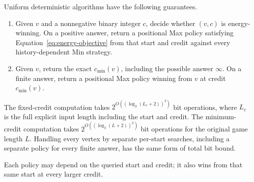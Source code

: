 \begin{corollary}
\label{cor:energy-credits}
Uniform deterministic algorithms have the following guarantees.
\begin{enumerate}
\item Given $v$ and a nonnegative binary integer $c$, decide whether
$(v,c)$ is energy-winning. On a positive answer, return a positional
Max policy satisfying Equation~\eqref{eq:energy-objective} from that
start and credit against every history-dependent Min strategy.
\item Given $v$, return the exact $c_{\min}(v)$, including the possible
answer $\infty$. On a finite answer, return a positional Max policy
winning from $v$ at credit $c_{\min}(v)$.
\end{enumerate}
The fixed-credit computation takes
$2^{O((\log_2(L_c+2))^2)}$ bit operations, where $L_c$ is the full
explicit input length including the start and credit. The
minimum-credit computation takes $2^{O((\log_2(L+2))^2)}$ bit
operations for the original game length $L$. Handling every vertex by
separate per-start searches, including a separate policy
for every finite answer, has the same form of total bit bound.

Each policy may depend on the queried start and credit; it also wins
from that same start at every larger credit.
\end{corollary}

